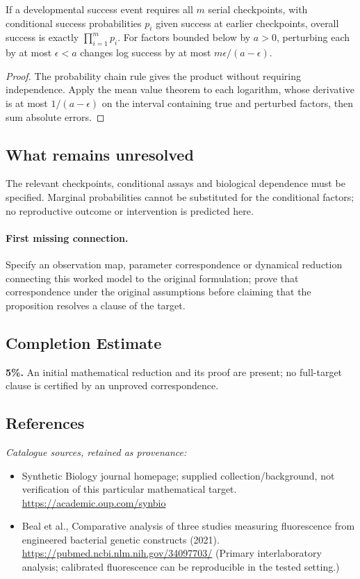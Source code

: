 \documentclass[11pt]{article}
\begin{document}
\begin{proposition}
If a developmental success event requires all $m$ serial checkpoints, with conditional success probabilities $p_i$ given success at earlier checkpoints, overall success is exactly $\prod_{i=1}^mp_i$. For factors bounded below by $a>0$, perturbing each by at most $\epsilon<a$ changes log success by at most $m\epsilon/(a-\epsilon)$.
\end{proposition}
\begin{proof}
The probability chain rule gives the product without requiring independence. Apply the mean value theorem to each logarithm, whose derivative is at most $1/(a-\epsilon)$ on the interval containing true and perturbed factors, then sum absolute errors.
\end{proof}
\subsection{What remains unresolved}
The relevant checkpoints, conditional assays and biological dependence must be specified. Marginal probabilities cannot be substituted for the conditional factors; no reproductive outcome or intervention is predicted here.
\paragraph{First missing connection.} Specify an observation map, parameter correspondence or dynamical reduction connecting this worked model to the original formulation; prove that correspondence under the original assumptions before claiming that the proposition resolves a clause of the target.
\subsection{Completion Estimate}
\textbf{5\%.} An initial mathematical reduction and its proof are present; no full-target clause is certified by an unproved correspondence.
\subsection{References}
\noindent\emph{Catalogue sources, retained as provenance:}
\begin{itemize}
\item Synthetic Biology journal homepage; supplied collection/background, not verification of this particular mathematical target. \url{https://academic.oup.com/synbio}
\item Beal et al., Comparative analysis of three studies measuring fluorescence from engineered bacterial genetic constructs (2021). \url{https://pubmed.ncbi.nlm.nih.gov/34097703/} (Primary interlaboratory analysis; calibrated fluorescence can be reproducible in the tested setting.)
\end{itemize}
\end{document}
